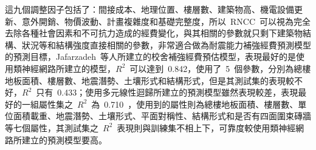 這九個調整因子包括了：間接成本、地理位置、樓層數、建築物高、機電設備更新、意外開銷、物價波動、計畫複雜度和基礎完整度，所以~RNCC~可以視為完全去除各種社會因素和不可抗力造成的經費變化，與其相關的參數就只剩下建築物結構、狀況等和結構強度直接相關的參數，非常適合做為耐震能力補強經費預測模型的預測目標，Jafarzadeh~等人所建立的校舍補強經費預估模型，表現最好的是使用類神經網路所建立的模型，$R^2$~可以達到~0.842，使用了~5~個參數，分別為總樓地板面積、樓層數、地震潛勢、土壤形式和結構形式，但是其測試集的表現較不好，$R^2$~只有~0.433；使用多元線性迴歸所建立的預測模型雖然表現較差，表現最好的一組屬性集之~$R^2$~為~0.710~，使用到的屬性則為總樓地板面積、樓層數、單位面積載重、地震潛勢、土壤形式、平面對稱性、結構形式和是否有四面圍束磚牆等七個屬性，其測試集之~$R^2$~表現則與訓練集不相上下，可靠度較使用類神經網路所建立的預測模型要高。


